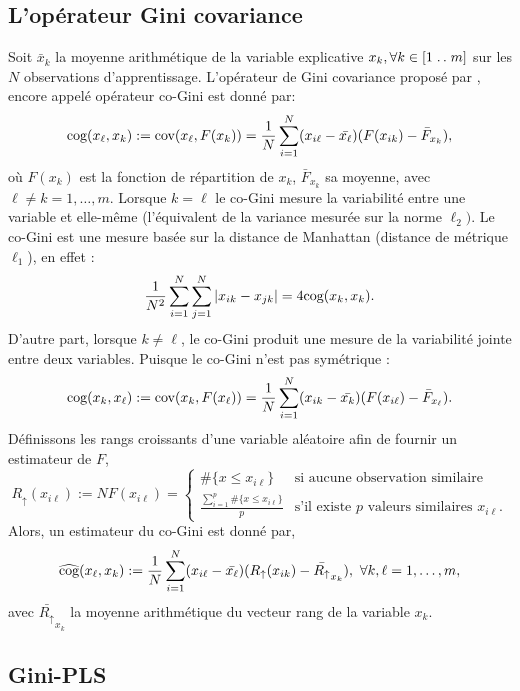 \subsection{L'opérateur Gini covariance}

Soit $\bar{x}_k$ la moyenne arithmétique de la variable explicative $x_k, \forall k \in [1\mathrel{{.}\,{.}}\nobreak m]$ sur les $N$ observations d'apprentissage. L'opérateur de Gini covariance proposé par \citet{Schechtman03}, encore appelé opérateur co-Gini est donné par:
\begin{equation}\label{cog0}
\text{cog}(x_\ell,x_k) := \text{cov}(x_\ell,F(x_k)) = \frac{1}{N}\sum_{i=1}^N(x_{i\ell} -\bar{x_\ell})(F(x_{ik})-\bar{F}_{x_k}),
\end{equation}
où $F(x_{k})$ est la fonction de répartition de $x_k$, $\bar{F}_{x_k}$ sa moyenne, avec $\ell \neq k = 1,\ldots,m$. Lorsque $k=\ell$ le co-Gini mesure la variabilité entre une variable et elle-même (l'équivalent de la variance mesurée sur la norme $\ell_2)$. Le co-Gini est une mesure basée sur la distance de Manhattan (distance de métrique $\ell_1$), en effet :
\begin{equation}\notag
\frac{1}{N^2}\sum_{i=1}^N\sum_{j=1}^N |x_{ik} - x_{jk}| = 4\text{cog}(x_k,x_k).
\end{equation}
D'autre part, lorsque $k\neq \ell$, le co-Gini produit une mesure de la variabilité jointe entre deux variables. Puisque le co-Gini n'est pas symétrique :
\[
\text{cog}(x_k,x_\ell) := \text{cov}(x_k ,F(x_\ell)) = \frac{1}{N}\sum_{i=1}^N(x_{ik} -\bar{x_k})(F(x_{i\ell})-\bar{F}_{x_\ell}).
\]
Définissons les rangs croissants d'une variable aléatoire afin de fournir un estimateur de $F$,
\[
R_\uparrow(x_{i\ell}) := NF(x_{i\ell}) = 
\left\{ \begin{array}{ll}
\#\{ x \leq x_{i\ell} \} & \text{si aucune observation similaire} \\
\frac{\sum_{i=1}^p\#\{ x \leq x_{i\ell} \}}{p} & \text{s'il existe $p$ valeurs similaires $x_{i\ell}$.}
\end{array}
\right.
\]
Alors, un estimateur du co-Gini est donné par,
\begin{eqnarray}\label{cog}
\widehat{\text{cog}}(x_\ell,x_k) := \frac{1}{N}\sum_{i=1}^N(x_{i\ell} -\bar{x_\ell})(R_\uparrow(x_{ik})-\bar{R_\uparrow}_{x_k}), \ \forall k,\ell=1,\ldots,m,
\end{eqnarray}
avec $\bar{R_\uparrow}_{x_k}$ la moyenne arithmétique du vecteur rang de la variable $x_k$. 


\subsection{Gini-PLS}

